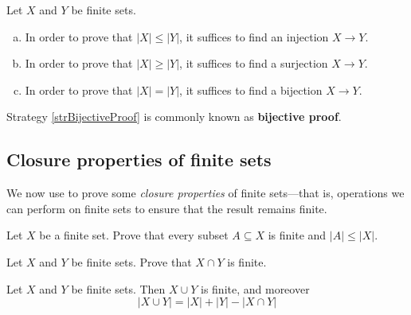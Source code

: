 \begin{strategy}
\label{strComparingSizesOfFiniteSets}
Let $X$ and $Y$ be finite sets.
\begin{enumerate}[(a)]
\item In order to prove that $|X| \le |Y|$, it suffices to find an injection $X \to Y$.
\item In order to prove that $|X| \ge |Y|$, it suffices to find a surjection $X \to Y$.
\item \label{strBijectiveProof} In order to prove that $|X| = |Y|$, it suffices to find a bijection $X \to Y$.
\end{enumerate}
Strategy \ref{strBijectiveProof} is commonly known as \textbf{bijective proof}.
\end{strategy}

\subsection*{Closure properties of finite sets}

We now use  to prove some \textit{closure properties} of finite sets---that is, operations we can perform on finite sets to ensure that the result remains finite.

\begin{exercise}
Let $X$ be a finite set. Prove that every subset $A \subseteq X$ is finite and $|A| \le |X|$.
%
\end{exercise}

\begin{exercise}
Let $X$ and $Y$ be finite sets. Prove that $X \cap Y$ is finite.
\end{exercise}

\begin{proposition}
\label{propUnionOfFiniteSetsIsFinite}
Let $X$ and $Y$ be finite sets. Then $X \cup Y$ is finite, and moreover
\[ |X \cup Y| = |X| + |Y| - |X \cap Y| \]
\end{proposition}

